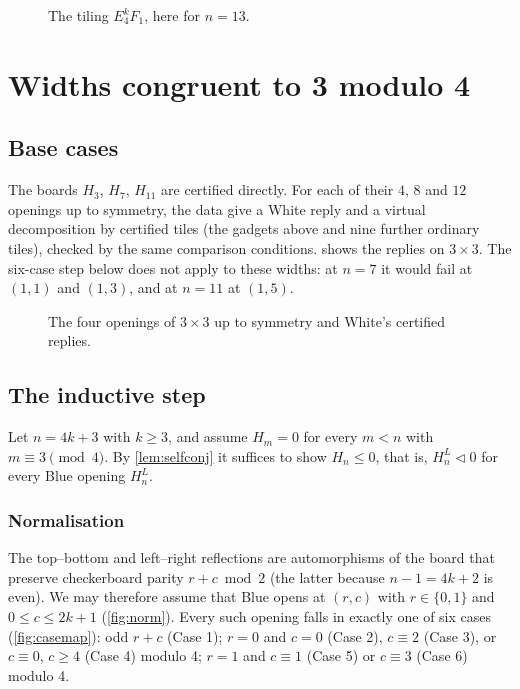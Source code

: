 \documentclass[11pt]{amsart}
\theoremstyle{definition}
\newcommand{\lf}{\mathrel{\triangleleft}}
\begin{document}
\begin{figure}[ht]
\centering
{}
\caption{The tiling $E_4^kF_1$, here for $n=13$.}
\label{fig:4k1}
\end{figure}

\section{Widths congruent to 3 modulo 4}\label{sec:4k3}

\subsection{Base cases}
The boards $H_3$, $H_7$, $H_{11}$ are certified directly. For each of their
$4$, $8$ and $12$ openings up to symmetry, the data give a White reply and a
virtual decomposition by certified tiles (the gadgets above and nine further
ordinary tiles), checked by the same comparison conditions.
 shows the replies on $3\times3$. The six-case step below
does not apply to these widths: at $n=7$ it would fail at $(1,1)$ and
$(1,3)$, and at $n=11$ at $(1,5)$.

\begin{figure}[ht]
\centering
{}
\caption{The four openings of $3\times 3$ up to symmetry and White's certified
replies.}
\label{fig:base3}
\end{figure}

\subsection{The inductive step}
Let $n=4k+3$ with $k\ge3$, and assume $H_m=0$ for every $m<n$ with
$m\equiv3\pmod4$. By \cref{lem:selfconj} it suffices to show $H_n\le0$,
that is, $H_n^L\lf0$ for every Blue opening $H_n^L$.

\subsubsection*{Normalisation}
The top--bottom and left--right reflections are automorphisms of the board
that preserve checkerboard parity $r+c \bmod 2$ (the latter because
$n-1=4k+2$ is even). We may therefore assume that Blue opens at $(r,c)$ with
$r\in\{0,1\}$ and $0\le c\le 2k+1$ (\cref{fig:norm}). Every such opening
falls in exactly one of six cases (\cref{fig:casemap}): odd $r+c$ (Case 1);
$r=0$ and $c=0$ (Case 2), $c\equiv2$ (Case 3), or $c\equiv0$, $c\ge4$
(Case 4) modulo 4; $r=1$ and $c\equiv1$ (Case 5) or $c\equiv3$ (Case 6)
modulo 4.
\end{document}
